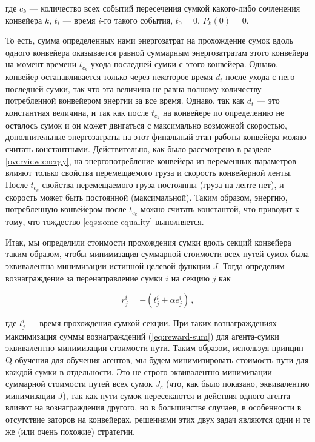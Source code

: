 \documentclass[specification,annotation,times]{itmo-student-thesis}
\theoremstyle{definition}
\begin{document}
где $c_k$ --- количество всех событий пересечения сумкой какого-либо сочленения
конвейера $k$, $t_i$ --- время $i$-го такого события, $t_0 = 0$, $P_k(0) = 0$.

То есть, сумма определенных нами энергозатрат на прохождение сумок вдоль одного
конвейера оказывается равной суммарным энергозатратам этого конвейера на момент
времени $t_{c_k}$ ухода последней сумки с этого конвейера. Однако, конвейер
останавливается только через некоторое время $d_t$ после ухода с него последней
сумки, так что эта величина не равна полному количеству потребленной конвейером
энергии за все время. Однако, так как $d_t$ --- это константная величина, и так
как после $t_{c_k}$ на конвейере по определению не осталось сумок и он может
двигаться с максимально возможной скоростью, дополнительные энергозатраты на
этот финальный этап работы конвейера можно считать константными. Действительно,
как было рассмотрено в разделе \ref{overview:energy}, на энергопотребление
конвейера из переменных параметров влияют только свойства перемещаемого груза и
скорость конвейерной ленты. После $t_{c_k}$ свойства перемещаемого груза
постоянны (груза на ленте нет), и скорость может быть постоянной (максимальной).
Таким образом, энергию, потребленную конвейером после $t_{c_k}$ можно считать
константой, что приводит к тому, что тождество \ref{eqs:some-equality}
выполняется.

Итак, мы определили стоимости прохождения сумки вдоль секций конвейера таким
образом, чтобы минимизация суммарной стоимости всех путей сумок была
эквивалентна минимизации истинной целевой функции $J$. Тогда определим
вознаграждение за перенаправление сумки $i$ на секцию $j$ как

\begin{equation}
  r_j^i = -(t_j^i + \alpha e_j^i) \,,
\end{equation}

где $t_j^i$ --- время прохождения сумкой секции. При таких вознаграждениях
максимизация суммы вознаграждений (\ref{eq:reward-sum}) для агента-сумки
эквивалентно минимизации стоимости пути. Таким образом, используя принцип
Q-обучения для обучения агентов, мы будем минимизировать стоимость пути для
каждой сумки в отдельности. Это не строго эквивалентно минимизации суммарной
стоимости путей всех сумок $J_c$ (что, как было показано, эквивалентно
минимизации $J$), так как пути сумок пересекаются и действия одного агента
влияют на вознаграждения другого, но в большинстве случаев, в особенности в
отсутствие заторов на конвейерах, решениями этих двух задач являются одни и те
же (или очень похожие) стратегии.
\end{document}
